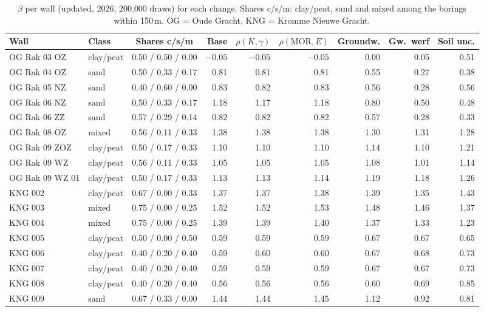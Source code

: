\begin{table}[htbp]
\centering
\small
\caption{$\beta$ per wall (updated, 2026, 200{,}000 draws) for each change.
Shares c/s/m: clay/peat, sand and mixed among the borings within 150\,m.
OG = Oude Gracht, KNG = Kromme Nieuwe Gracht.}
\label{tab:sens-walls}
\setlength{\tabcolsep}{4pt}
\begin{tabular}{@{}l l c r r r r r r@{}}
\toprule
Wall & Class & Shares c/s/m & Base & $\rho(K,\gamma)$ & $\rho(\text{MOR},E)$ & Groundw. & Gw.\ werf & Soil unc. \\
\midrule
OG Rak 03 OZ & clay/peat & 0.50 / 0.50 / 0.00 & $-0.05$ & $-0.05$ & $-0.05$ & 0.00 & 0.05 & 0.51 \\
OG Rak 04 OZ & sand & 0.50 / 0.33 / 0.17 & 0.81 & 0.81 & 0.81 & 0.55 & 0.27 & 0.38 \\
OG Rak 05 NZ & sand & 0.40 / 0.60 / 0.00 & 0.83 & 0.82 & 0.83 & 0.56 & 0.28 & 0.56 \\
OG Rak 06 NZ & sand & 0.50 / 0.33 / 0.17 & 1.18 & 1.17 & 1.18 & 0.80 & 0.50 & 0.48 \\
OG Rak 06 ZZ & sand & 0.57 / 0.29 / 0.14 & 0.82 & 0.82 & 0.82 & 0.57 & 0.28 & 0.33 \\
OG Rak 08 OZ & mixed & 0.56 / 0.11 / 0.33 & 1.38 & 1.38 & 1.38 & 1.30 & 1.31 & 1.28 \\
OG Rak 09 ZOZ & clay/peat & 0.50 / 0.17 / 0.33 & 1.10 & 1.10 & 1.10 & 1.14 & 1.10 & 1.21 \\
OG Rak 09 WZ & clay/peat & 0.56 / 0.11 / 0.33 & 1.05 & 1.05 & 1.05 & 1.08 & 1.01 & 1.14 \\
OG Rak 09 WZ 01 & clay/peat & 0.50 / 0.17 / 0.33 & 1.13 & 1.13 & 1.14 & 1.19 & 1.18 & 1.26 \\
KNG 002 & clay/peat & 0.67 / 0.00 / 0.33 & 1.37 & 1.37 & 1.38 & 1.39 & 1.35 & 1.43 \\
KNG 003 & mixed & 0.75 / 0.00 / 0.25 & 1.52 & 1.52 & 1.53 & 1.48 & 1.46 & 1.37 \\
KNG 004 & mixed & 0.75 / 0.00 / 0.25 & 1.39 & 1.39 & 1.40 & 1.37 & 1.33 & 1.23 \\
KNG 005 & clay/peat & 0.50 / 0.00 / 0.50 & 0.59 & 0.59 & 0.59 & 0.67 & 0.67 & 0.65 \\
KNG 006 & clay/peat & 0.40 / 0.20 / 0.40 & 0.59 & 0.60 & 0.60 & 0.67 & 0.68 & 0.73 \\
KNG 007 & clay/peat & 0.40 / 0.20 / 0.40 & 0.59 & 0.59 & 0.59 & 0.67 & 0.67 & 0.73 \\
KNG 008 & clay/peat & 0.40 / 0.20 / 0.40 & 0.56 & 0.56 & 0.56 & 0.60 & 0.69 & 0.85 \\
KNG 009 & sand & 0.67 / 0.33 / 0.00 & 1.44 & 1.44 & 1.45 & 1.12 & 0.92 & 0.81 \\
\bottomrule
\end{tabular}
\end{table}

